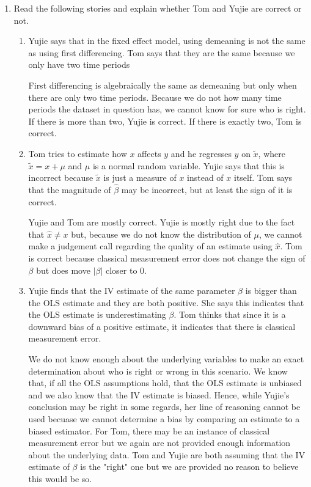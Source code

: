 \documentclass[11pt]{SelfArxOneColBMN}
\affiliation{\textsuperscript{1}\textit{John E. Walker Department of Economics,
Clemson University,Clemson, SC: email ijdavis@g.clemson.edu}}
\date{\small{Version ~\today}}
\begin{document}
\flushbottom

\maketitle

\begin{enumerate}
  \item Read the following stories and explain whether Tom and Yujie are correct or not.
  \begin{enumerate}
    \item Yujie says that in the fixed effect model, using demeaning is not the same as using first differencing. Tom says that they are the same because we only have two time periods
    \begin{solution}
      First differencing is algebraically the same as demeaning but only when there are only two time periods. Because we do not how many time periods the dataset in question has, we cannot know for sure who is right. If there is more than two, Yujie is correct. If there is exactly two, Tom is correct.
    \end{solution}
    \item Tom tries to estimate how $x$ affects $y$ and he regresses $y$ on $\widetilde{x}$, where $\widetilde{x} = x + \mu$ and $\mu$ is a normal random variable. Yujie says that this is incorrect because $\widetilde{x}$ is just a measure of $x$ instead of $x$ itself. Tom says that the magnitude of $\hat{\beta}$ may be incorrect, but at least the sign of it is correct.
    \begin{solution}
      Yujie and Tom are mostly correct. Yujie is mostly right due to the fact that $\hat{x} \neq x$ but, because we do not know the distribution of $\mu$, we cannot make a judgement call regarding the quality of an estimate using $\hat{x}$. Tom is correct because classical measurement error does not change the sign of $\beta$ but does move $|\beta|$ closer to 0.  
    \end{solution}
    \item Yujie finds that the IV estimate of the same parameter $\beta$ is bigger than the OLS estimate and they are both positive. She says this indicates that the OLS estimate is underestimating $\beta$. Tom thinks that since it  is a downward bias of a positive estimate, it indicates that there is classical measurement error.
    \begin{solution} 
      We do not know enough about the underlying variables to make an exact determination about who is right or wrong in this scenario. We know that, if all the OLS assumptions hold, that the OLS estimate is unbiased and we also know that the IV estimate is biased. Hence, while Yujie's conclusion may be right in some regards, her line of reasoning cannot be used becuase we cannot determine a bias by comparing an estimate to a biased estimator. For Tom, there may be an instance of classical measurement error but we again are not provided enough information about the underlying data. Tom and Yujie are both assuming that the IV estimate of $\beta$ is the "right" one but we are provided no reason to believe this would be so.

\end{solution}
\end{enumerate}
\end{enumerate}
\end{document}
